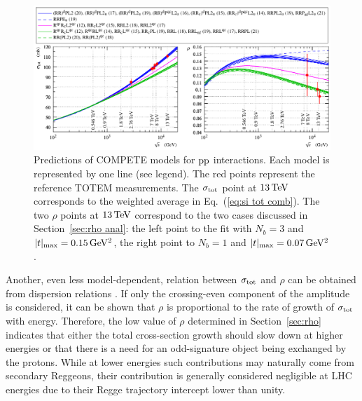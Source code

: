 \begin{figure}
\begin{center}
\includegraphics{fig/compete_bands_si_tot_rho.pdf}
\caption{%
Predictions of COMPETE models \cite{compete-details} for $\rm pp$ interactions. Each model is represented by one line (see legend). The red points represent the reference TOTEM measurements. The $\sigma_{\rm tot}$ point at $13\,{\rm TeV}$ corresponds to the weighted average in Eq.~(\ref{eq:si tot comb}). The two $\rho$ points at $13\,{\rm TeV}$ correspond to the two cases discussed in Section~\ref{sec:rho anal}: the left point to the fit with $N_b=3$ and $|t|_{\rm max} = 0.15\,{\rm GeV^2}$, the right point to $N_b=1$ and $|t|_{\rm max} = 0.07\,{\rm GeV^2}$.
}
\label{fig:comp bands}
\end{center}
\end{figure}

Another, even less model-dependent, relation between $\sigma_{\rm tot}$ and $\rho$ can be obtained from dispersion relations \cite{dremin-dispersion,barone-predazzi}. If only the crossing-even component of the amplitude is considered, it can be shown that $\rho$ is proportional to the rate of growth of $\sigma_{\rm tot}$ with energy. Therefore, the low value of $\rho$ determined in Section~\ref{sec:rho} indicates that either the total cross-section growth should slow down at higher energies or that there is a need for an odd-signature object being exchanged by the protons. While at lower energies such contributions may naturally come from secondary Reggeons, their contribution is generally considered negligible at LHC energies due to their Regge trajectory intercept lower than unity.

